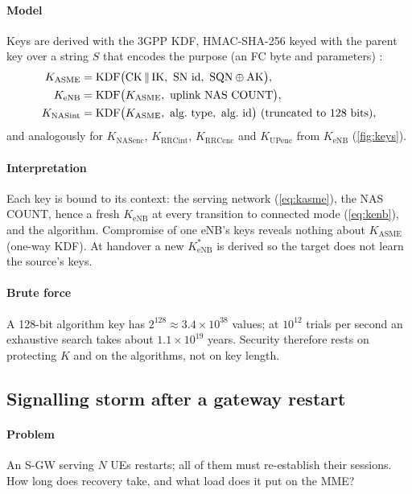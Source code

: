 \documentclass[11pt,a4paper]{article}
\begin{document}
\paragraph{Model} Keys are derived with the 3GPP KDF, HMAC-SHA-256 keyed with the parent key over a
string $S$ that encodes the purpose (an FC byte and parameters) \cite{ts33401}:
\begin{subequations}\label{eq:kdf}
\begin{align}
  K_{\mathrm{ASME}} &= \KDF\bigl(\mathrm{CK}\concat\mathrm{IK},\ \text{SN id},\ \mathrm{SQN}\xor\mathrm{AK}\bigr), \label{eq:kasme}\\
  K_{\mathrm{eNB}} &= \KDF\bigl(K_{\mathrm{ASME}},\ \text{uplink NAS COUNT}\bigr), \label{eq:kenb}\\
  K_{\mathrm{NASint}} &= \KDF\bigl(K_{\mathrm{ASME}},\ \text{alg.\ type},\ \text{alg.\ id}\bigr)\ \text{(truncated to 128 bits)}, \label{eq:knas}
\end{align}
\end{subequations}
and analogously for $K_{\mathrm{NASenc}}$, $K_{\mathrm{RRCint}}$, $K_{\mathrm{RRCenc}}$ and $K_{\mathrm{UPenc}}$
from $K_{\mathrm{eNB}}$ (\cref{fig:keys}).
\paragraph{Interpretation} Each key is bound to its context: the serving network (\cref{eq:kasme}),
the NAS COUNT, hence a fresh $K_{\mathrm{eNB}}$ at every transition to connected mode
(\cref{eq:kenb}), and the algorithm. Compromise of one eNB's keys reveals nothing about
$K_{\mathrm{ASME}}$ (one-way KDF). At handover a new $K_{\mathrm{eNB}}^\ast$ is derived so the target does
not learn the source's keys.
\paragraph{Brute force} A 128-bit algorithm key has $2^{128}\approx3.4\times10^{38}$ values; at $10^{12}$
trials per second an exhaustive search takes about $1.1\times10^{19}$ years. Security therefore rests on
protecting $K$ and on the algorithms, not on key length.

\subsection{Signalling storm after a gateway restart}\label{sec:storm}
\paragraph{Problem} An S-GW serving $N$ UEs restarts; all of them must re-establish their sessions.
How long does recovery take, and what load does it put on the MME?
\end{document}
